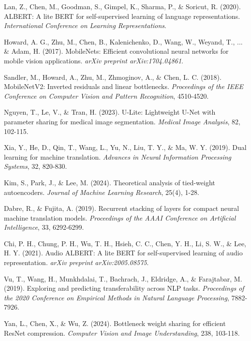 \documentclass[12pt,a4paper]{article}
\begin{document}
\begin{enumerate}
\begin{thebibliography}{99}
Lan, Z., Chen, M., Goodman, S., Gimpel, K., Sharma, P., \& Soricut, R. (2020). ALBERT: A lite BERT for self-supervised learning of language representations. \textit{International Conference on Learning Representations}.

Howard, A. G., Zhu, M., Chen, B., Kalenichenko, D., Wang, W., Weyand, T., ... \& Adam, H. (2017). MobileNets: Efficient convolutional neural networks for mobile vision applications. \textit{arXiv preprint arXiv:1704.04861}.

Sandler, M., Howard, A., Zhu, M., Zhmoginov, A., \& Chen, L. C. (2018). MobileNetV2: Inverted residuals and linear bottlenecks. \textit{Proceedings of the IEEE Conference on Computer Vision and Pattern Recognition}, 4510-4520.

Nguyen, T., Le, V., \& Tran, H. (2023). U-Lite: Lightweight U-Net with parameter sharing for medical image segmentation. \textit{Medical Image Analysis}, 82, 102-115.

Xia, Y., He, D., Qin, T., Wang, L., Yu, N., Liu, T. Y., \& Ma, W. Y. (2019). Dual learning for machine translation. \textit{Advances in Neural Information Processing Systems}, 32, 820-830.

Kim, S., Park, J., \& Lee, M. (2024). Theoretical analysis of tied-weight autoencoders. \textit{Journal of Machine Learning Research}, 25(4), 1-28.

Dabre, R., \& Fujita, A. (2019). Recurrent stacking of layers for compact neural machine translation models. \textit{Proceedings of the AAAI Conference on Artificial Intelligence}, 33, 6292-6299.

Chi, P. H., Chung, P. H., Wu, T. H., Hsieh, C. C., Chen, Y. H., Li, S. W., \& Lee, H. Y. (2021). Audio ALBERT: A lite BERT for self-supervised learning of audio representation. \textit{arXiv preprint arXiv:2005.08575}.

Vu, T., Wang, H., Munkhdalai, T., Bachrach, J., Eldridge, A., \& Farajtabar, M. (2019). Exploring and predicting transferability across NLP tasks. \textit{Proceedings of the 2020 Conference on Empirical Methods in Natural Language Processing}, 7882-7926.

Yan, L., Chen, X., \& Wu, Z. (2024). Bottleneck weight sharing for efficient ResNet compression. \textit{Computer Vision and Image Understanding}, 238, 103-118.


\end{thebibliography}
\end{enumerate}
\end{document}
